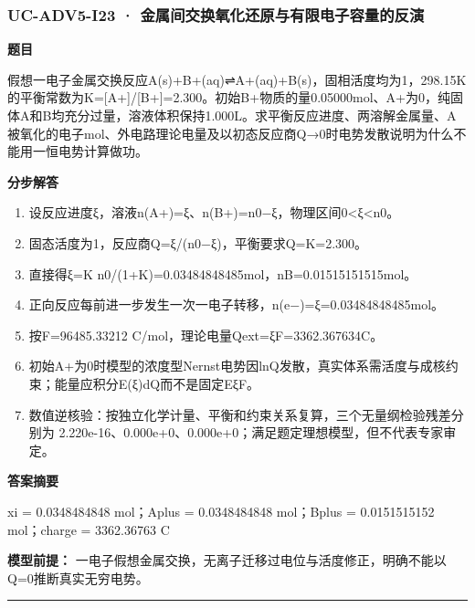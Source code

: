 \documentclass[UTF8,11pt,a4paper]{ctexart}
\begin{document}
\subsubsection*{UC-ADV5-I23 · 金属间交换氧化还原与有限电子容量的反演}
\noindent\textbf{题目}\par
假想一电子金属交换反应A(s)+B+(aq)⇌A+(aq)+B(s)，固相活度均为1，298.15K的平衡常数为K=[A+]/[B+]=2.300。初始B+物质的量0.05000mol、A+为0，纯固体A和B均充分过量，溶液体积保持1.000L。求平衡反应进度、两溶解金属量、A被氧化的电子mol、外电路理论电量及以初态反应商Q→0时电势发散说明为什么不能用一恒电势计算做功。\par
\medskip\noindent\textbf{分步解答}
\begin{enumerate}
\item 设反应进度ξ，溶液n(A+)=ξ、n(B+)=n0−ξ，物理区间0<ξ<n0。
\item 固态活度为1，反应商Q=ξ/(n0−ξ)，平衡要求Q=K=2.300。
\item 直接得ξ=K n0/(1+K)=0.03484848485mol，nB=0.01515151515mol。
\item 正向反应每前进一步发生一次一电子转移，n(e−)=ξ=0.03484848485mol。
\item 按F=96485.33212 C/mol，理论电量Qext=ξF=3362.367634C。
\item 初始A+为0时模型的浓度型Nernst电势因lnQ发散，真实体系需活度与成核约束；能量应积分E(ξ)dQ而不是固定EξF。
\item 数值逆核验：按独立化学计量、平衡和约束关系复算，三个无量纲检验残差分别为 2.220e-16、0.000e+0、0.000e+0；满足题定理想模型，但不代表专家审定。
\end{enumerate}
\noindent\textbf{答案摘要}\par
xi = 0.0348484848 mol；Aplus = 0.0348484848 mol；Bplus = 0.0151515152 mol；charge = 3362.36763 C\par
\noindent\textbf{模型前提：}
一电子假想金属交换，无离子迁移过电位与活度修正，明确不能以Q=0推断真实无穷电势。\par
\medskip\hrule\medskip
{}
\end{document}
